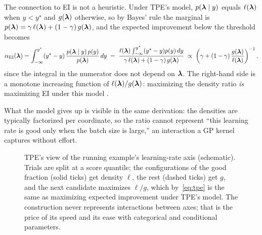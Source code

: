 The connection to EI is not a
heuristic. Under TPE's model, $p(\bm{\lambda} \mid y)$ equals $\ell(\bm{\lambda})$
when $y < y^{\star}$ and $g(\bm{\lambda})$ otherwise, so by Bayes' rule the
marginal is
$p(\bm{\lambda}) = \gamma\, \ell(\bm{\lambda}) + (1-\gamma)\, g(\bm{\lambda})$, and the
expected improvement below the threshold becomes
\begin{equation}
\alpha_{\mathrm{EI}}(\bm{\lambda})
= \int_{-\infty}^{y^{\star}} (y^{\star} - y)\,
  \frac{p(\bm{\lambda} \mid y)\, p(y)}{p(\bm{\lambda})} \, dy
\;=\; \frac{\ell(\bm{\lambda})\int_{-\infty}^{y^{\star}}(y^\star - y)p(y)\,dy}
  {\gamma\, \ell(\bm{\lambda}) + (1-\gamma)\, g(\bm{\lambda})}
\;\propto\;
\left( \gamma + (1 - \gamma)\, \frac{g(\bm{\lambda})}{\ell(\bm{\lambda})}
\right)^{-1},
\label{eq:tpe}
\end{equation}
since the integral in the numerator does not depend on $\bm{\lambda}$. The
right-hand side is a monotone increasing function of
$\ell(\bm{\lambda})/g(\bm{\lambda})$: maximizing the density ratio \emph{is}
maximizing EI under this model \citep{bergstra2011tpe}.

What the model
gives up is visible in the same derivation: the densities are typically
factorized per coordinate, so the ratio cannot represent ``this learning
rate is good only when the batch size is large,'' an interaction a GP
kernel captures without effort.

\begin{figure}[t]
\centering
{}
\caption{TPE's view of the running example's learning-rate axis
(schematic). Trials are split at a score quantile; the configurations of
the good fraction (solid ticks) get density $\ell$, the rest (dashed
ticks) get $g$, and the next candidate maximizes $\ell/g$, which
by~\eqref{eq:tpe} is the same as maximizing expected improvement under
TPE's model. The construction never represents interactions between axes;
that is the price of its speed and its ease with categorical and
conditional parameters.}
\label{fig:tpe-fig}
\end{figure}

